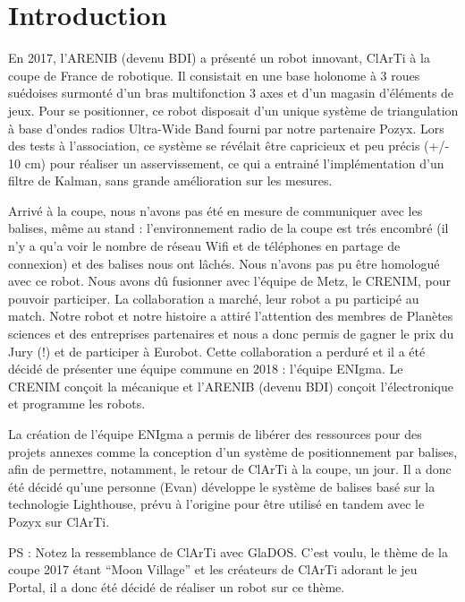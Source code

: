 ﻿\chapter*{Introduction}

En 2017, l'ARENIB (devenu BDI) a présenté un robot innovant, ClArTi à la coupe de France de robotique. Il consistait en une base holonome à 3 roues suédoises surmonté d'un bras multifonction 3 axes et d'un magasin d'éléments de jeux. Pour se positionner, ce robot disposait d'un unique système de triangulation à base d'ondes radios Ultra-Wide Band fourni par notre partenaire Pozyx. Lors des tests à l'association, ce système se révélait être capricieux et peu précis (+/- 10 cm) pour réaliser un asservissement, ce qui a entrainé l'implémentation d'un filtre de Kalman, sans grande amélioration sur les mesures.

Arrivé à la coupe, nous n'avons pas été en mesure de communiquer avec les balises, même au stand : l'environnement radio de la coupe est trés encombré (il n'y a qu'a voir le nombre de réseau Wifi et de téléphones en partage de connexion) et des balises nous ont lâchés. Nous n'avons pas pu être homologué avec ce robot. Nous avons dû fusionner avec l'équipe de Metz, le CRENIM, pour pouvoir participer. La collaboration a marché, leur robot a pu participé au match. Notre robot et notre histoire a attiré l'attention des membres de Planètes sciences et des entreprises partenaires et nous a donc permis de gagner le prix du Jury (!) et de participer à Eurobot. Cette collaboration a perduré et il a été décidé de présenter une équipe commune en 2018 : l'équipe ENIgma. Le CRENIM conçoit la mécanique et l'ARENIB (devenu BDI) conçoit l'électronique et programme les robots.

La création de l'équipe ENIgma a permis de libérer des ressources pour des projets annexes comme la conception d'un système de positionnement par balises, afin de permettre, notamment, le retour de ClArTi à la coupe, un jour. Il a donc été décidé qu'une personne (Evan) développe le système de balises basé sur la technologie Lighthouse, prévu à l'origine pour être utilisé en tandem avec le Pozyx sur ClArTi.

PS : Notez la ressemblance de ClArTi avec GlaDOS. C'est voulu, le thème de la coupe 2017 étant "`Moon Village"' et les créateurs de ClArTi adorant le jeu Portal, il a donc été décidé de réaliser un robot sur ce thème.
